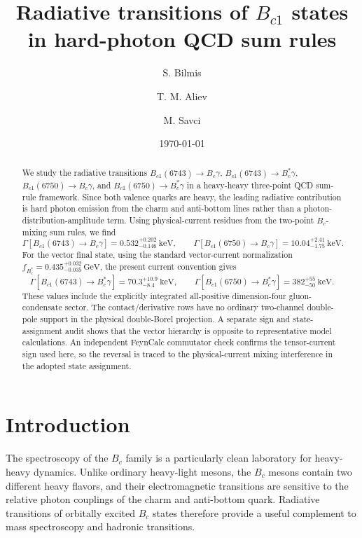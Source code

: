 \documentclass[aps,prd,preprint,nofootinbib,superscriptaddress]{revtex4-2}
\newcommand{\Bc}{B_c}
\newcommand{\Bcst}{B_c^\ast}
\newcommand{\Bcone}{B_{c1}}
\newcommand{\GeV}{\mathrm{GeV}}
\newcommand{\keV}{\mathrm{keV}}
\begin{document}
\title{Radiative transitions of \(B_{c1}\) states in hard-photon QCD sum rules}

\author{S. Bilmis}
\author{T. M. Aliev}
\author{M. Savci}

\date{\today}

\begin{abstract}
We study the radiative transitions
\(\Bcone(6743)\to \Bc\gamma\), \(\Bcone(6743)\to \Bcst\gamma\),
\(\Bcone(6750)\to \Bc\gamma\), and \(\Bcone(6750)\to \Bcst\gamma\)
in a heavy-heavy three-point QCD sum-rule framework.  Since both valence
quarks are heavy, the leading radiative contribution is hard photon emission
from the charm and anti-bottom lines rather than a photon-distribution-amplitude
term.  Using physical-current residues from the two-point \(B_c\)-mixing sum
rules, we find
\[
\Gamma[\Bcone(6743)\to \Bc\gamma]=0.532^{+0.202}_{-0.146}~\keV,\qquad
\Gamma[\Bcone(6750)\to \Bc\gamma]=10.04^{+2.41}_{-1.75}~\keV .
\]
For the vector final state, using the standard vector-current normalization
\(f_{\Bcst}=0.435^{+0.032}_{-0.035}\,\GeV\), the present current convention gives
\[
\Gamma[\Bcone(6743)\to \Bcst\gamma]=70.3^{+10.9}_{-8.4}~\keV,\qquad
\Gamma[\Bcone(6750)\to \Bcst\gamma]=382^{+55}_{-50}~\keV .
\]
These values include the explicitly integrated all-positive dimension-four
gluon-condensate sector.  The contact/derivative rows have no ordinary
two-channel double-pole support in the physical double-Borel projection.  A
separate sign and state-assignment audit shows that the vector hierarchy is
opposite to representative model calculations.  An independent FeynCalc
commutator check confirms the tensor-current sign used here, so the reversal is
traced to the physical-current mixing interference in the adopted state
assignment.
\end{abstract}

\maketitle

\section{Introduction}
\label{sec:intro}

The spectroscopy of the \(B_c\) family is a particularly clean laboratory for
heavy-heavy dynamics.  Unlike ordinary heavy-light mesons, the \(B_c\) mesons
contain two different heavy flavors, and their electromagnetic transitions are
sensitive to the relative photon couplings of the charm and anti-bottom quark.
Radiative transitions of orbitally excited \(B_c\) states therefore provide a
useful complement to mass spectroscopy and hadronic transitions.
\end{document}
